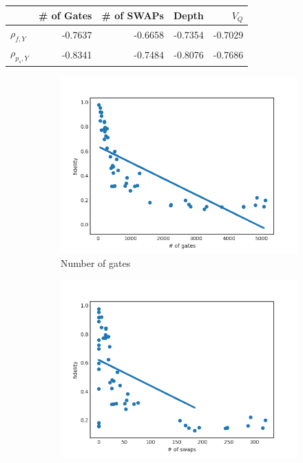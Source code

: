 \documentclass[11pt]{article}
\begin{document}
\begin{center}
\begin{tabular}{lrrrr}
 & \# of Gates & \# of SWAPs & Depth & \(V_Q\)\\
\hline
\(\rho _{f,Y}\) & -0.7637 & -0.6658 & -0.7354 & -0.7029\\
\(\rho _{p_s,Y}\) & -0.8341 & -0.7484 & -0.8076 & -0.7686\\
\hline
\end{tabular}
\end{center}


\begin{figure}[H] 
  \begin{subfigure}[b]{0.5\linewidth}
    \centering
    \includegraphics[width=0.75\linewidth]{f_g_1000_0_005} 
    \caption{Number of gates} 
    \label{fig:f_g_1000} 
    \vspace{4ex}
  \end{subfigure}%
  \begin{subfigure}[b]{0.5\linewidth}
    \centering
    \includegraphics[width=0.75\linewidth]{f_s_1000_0_005} 

\end{subfigure}
\end{figure}
\end{document}
